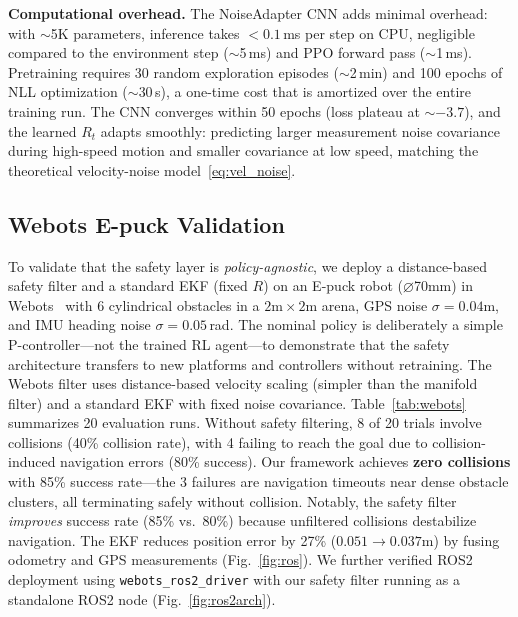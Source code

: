 \documentclass[letterpaper, 10 pt, conference]{ieeeconf}
\begin{document}
\textbf{Computational overhead.} The NoiseAdapter CNN adds minimal overhead: with $\sim$5K parameters, inference takes $< 0.1$\,ms per step on CPU, negligible compared to the environment step ($\sim$5\,ms) and PPO forward pass ($\sim$1\,ms). Pretraining requires 30 random exploration episodes ($\sim$2\,min) and 100 epochs of NLL optimization ($\sim$30$\,$s), a one-time cost that is amortized over the entire training run. The CNN converges within 50 epochs (loss plateau at $\sim$$-3.7$), and the learned $R_t$ adapts smoothly: predicting larger measurement noise covariance during high-speed motion and smaller covariance at low speed, matching the theoretical velocity-noise model~\eqref{eq:vel_noise}.

\subsection{Webots E-puck Validation}

To validate that the safety layer is \emph{policy-agnostic}, we deploy a distance-based safety filter and a standard EKF (fixed $R$) on an E-puck robot ($\varnothing$70mm) in Webots~\cite{webots2004} with 6 cylindrical obstacles in a $2\text{m} \times 2\text{m}$ arena, GPS noise $\sigma=0.04$m, and IMU heading noise $\sigma=0.05$\,rad. The nominal policy is deliberately a simple P-controller---not the trained RL agent---to demonstrate that the safety architecture transfers to new platforms and controllers without retraining. The Webots filter uses distance-based velocity scaling (simpler than the manifold filter) and a standard EKF with fixed noise covariance. Table~\ref{tab:webots} summarizes 20 evaluation runs. Without safety filtering, 8 of 20 trials involve collisions (40\% collision rate), with 4 failing to reach the goal due to collision-induced navigation errors (80\% success). Our framework achieves \textbf{zero collisions} with 85\% success rate---the 3 failures are navigation timeouts near dense obstacle clusters, all terminating safely without collision. Notably, the safety filter \emph{improves} success rate (85\% vs.\ 80\%) because unfiltered collisions destabilize navigation. The EKF reduces position error by 27\% ($0.051 \rightarrow 0.037$m) by fusing odometry and GPS measurements (Fig.~\ref{fig:ros}). We further verified ROS2 deployment using \texttt{webots\_ros2\_driver} with our safety filter running as a standalone ROS2 node (Fig.~\ref{fig:ros2arch}).
\end{document}
